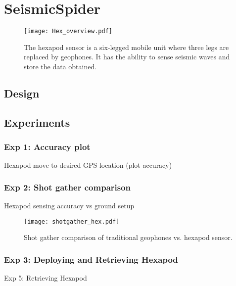 \section{SeismicSpider}\label{sec:SeismicSpider}
\begin{figure} \centering
  {\texttt{[image: Hex\_overview.pdf]}}
 \caption{The hexapod sensor is a six-legged mobile unit  where three legs are replaced by geophones. It has the ability to sense seismic waves and store the data obtained.} 
 \label{fig:TradvsAutoDrop}
\end{figure}
\subsection{Design}

\subsection{Experiments}
\subsubsection{Exp 1: Accuracy plot}
Hexapod move to desired GPS location  (plot accuracy)\\
\subsubsection{Exp 2: Shot gather comparison}
Hexapod sensing accuracy vs ground setup\\
\begin{figure} \centering
  {\texttt{[image: shotgather\_hex.pdf]}}
 \caption{Shot gather comparison of traditional geophones vs. hexapod sensor.  
 \label{fig:TradvsAutoDrop}}
\end{figure}
\subsubsection{Exp 3: Deploying and Retrieving Hexapod}
Exp 5: Retrieving Hexapod\\